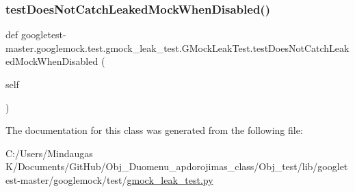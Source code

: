 \mbox{\label{classgoogletest-master_1_1googlemock_1_1test_1_1gmock__leak__test_1_1_g_mock_leak_test_a717eadcb1b677eb59adb0cc0ee687b84}} 
\subsubsection{\texorpdfstring{testDoesNotCatchLeakedMockWhenDisabled()}{testDoesNotCatchLeakedMockWhenDisabled()}}
{\footnotesize\ttfamily def googletest-\/master.\+googlemock.\+test.\+gmock\+\_\+leak\+\_\+test.\+G\+Mock\+Leak\+Test.\+test\+Does\+Not\+Catch\+Leaked\+Mock\+When\+Disabled (\begin{DoxyParamCaption}\item[{}]{self }\end{DoxyParamCaption})}



The documentation for this class was generated from the following file\+:\begin{DoxyCompactItemize}
\item 
C\+:/\+Users/\+Mindaugas K/\+Documents/\+Git\+Hub/\+Obj\+\_\+\+Duomenu\+\_\+apdorojimas\+\_\+class/\+Obj\+\_\+test/lib/googletest-\/master/googlemock/test/\mbox{\hyperlink{_obj__test_2lib_2googletest-master_2googlemock_2test_2gmock__leak__test_8py}{gmock\+\_\+leak\+\_\+test.\+py}}\end{DoxyCompactItemize}
